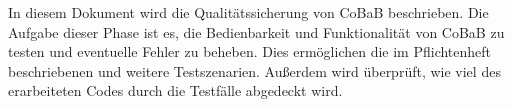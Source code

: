 In diesem Dokument wird die Qualitätssicherung von CoBaB beschrieben. \newline
Die Aufgabe dieser Phase ist es, die Bedienbarkeit und Funktionalität von CoBaB zu testen und eventuelle Fehler zu beheben. Dies ermöglichen die im Pflichtenheft beschriebenen und weitere Testszenarien. \newline
Außerdem wird überprüft, wie viel des erarbeiteten Codes durch die Testfälle abgedeckt wird. 